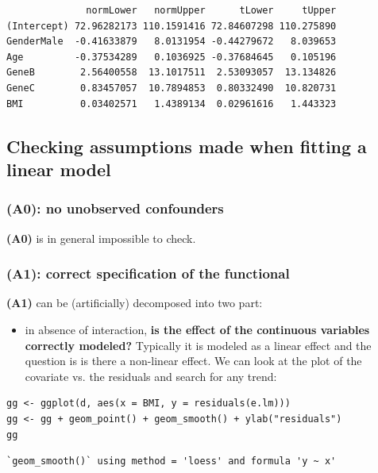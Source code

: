 \documentclass[12pt]{article}
\begin{document}
\begin{verbatim}
              normLower   normUpper      tLower     tUpper
(Intercept) 72.96282173 110.1591416 72.84607298 110.275890
GenderMale  -0.41633879   8.0131954 -0.44279672   8.039653
Age         -0.37534289   0.1036925 -0.37684645   0.105196
GeneB        2.56400558  13.1017511  2.53093057  13.134826
GeneC        0.83457057  10.7894853  0.80332490  10.820731
BMI          0.03402571   1.4389134  0.02961616   1.443323
\end{verbatim}

\subsection{Checking assumptions made when fitting a linear model}
\label{sec:org8ea3ceb}

\subsubsection{\textbf{(A0)}: no unobserved confounders}
\label{sec:org952d969}
\textbf{(A0)} is in general impossible to check.

\subsubsection{\textbf{(A1)}: correct specification of the functional}
\label{sec:org4634a94}
\textbf{(A1)} can be (artificially) decomposed into two part:
\begin{itemize}
\item in absence of interaction, \textbf{is the effect of the continuous
variables correctly modeled?} Typically it is modeled as a linear
effect and the question is is there a non-linear effect. We can look
at the plot of the covariate vs. the residuals and search for any
trend:
\end{itemize}
\lstset{language=r,label= ,caption= ,captionpos=b,numbers=none}
\begin{lstlisting}
gg <- ggplot(d, aes(x = BMI, y = residuals(e.lm)))
gg <- gg + geom_point() + geom_smooth() + ylab("residuals")
gg
\end{lstlisting}

\begin{verbatim}
`geom_smooth()` using method = 'loess' and formula 'y ~ x'
\end{verbatim}
\end{document}
